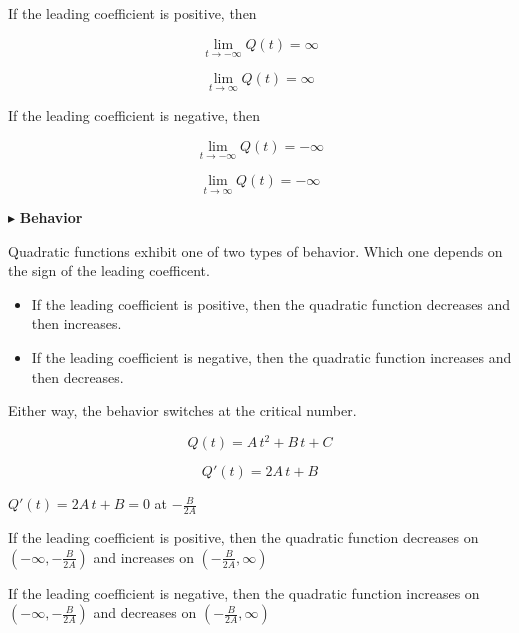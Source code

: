 \documentclass{ximera}
\begin{document}
If the leading coefficient is positive, then 


\[
\lim\limits_{t \to -\infty} Q(t) = \infty
\]

\[
\lim\limits_{t \to \infty} Q(t) = \infty
\]





If the leading coefficient is negative, then 


\[
\lim\limits_{t \to -\infty} Q(t) = -\infty
\]

\[
\lim\limits_{t \to \infty} Q(t) = -\infty
\]









$\blacktriangleright$ \textbf{\textcolor{red!10!blue!90!}{Behavior}} 


Quadratic functions exhibit one of two types of behavior.   Which one depends on the sign of the leading coefficent.  


\begin{itemize}
  \item If the leading coefficient is positive, then the quadratic function decreases and then increases.
  \item If the leading coefficient is negative, then the quadratic function increases and then decreases.
\end{itemize}

Either way, the behavior switches at the critical number.


\[
Q(t) = A \, t^2 + B \, t + C
\]


\[
Q'(t) = 2A \, t + B
\]


$Q'(t) = 2A \, t + B = 0$ at $-\frac{B}{2A}$




If the leading coefficient is positive, then the quadratic function decreases on $\left( -\infty, -\frac{B}{2A} \right)$ and increases on $\left( -\frac{B}{2A}, \infty \right)$





If the leading coefficient is negative, then the quadratic function increases on $\left( -\infty, -\frac{B}{2A} \right)$ and decreases on $\left( -\frac{B}{2A}, \infty \right)$
\end{document}
